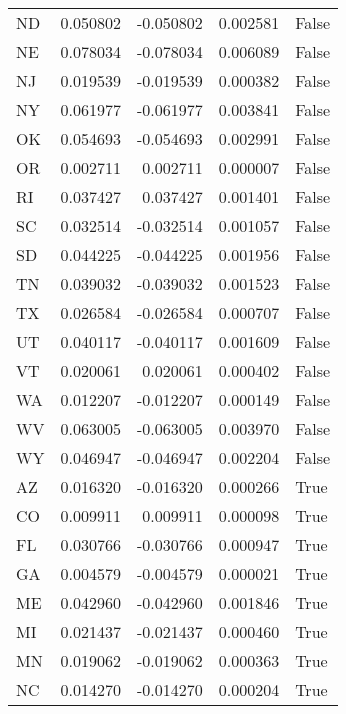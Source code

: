 \begin{table}
\begin{tabular}{lrrrl}
      ND &   0.050802 & -0.050802 &       0.002581 &         False \\
      NE &   0.078034 & -0.078034 &       0.006089 &         False \\
      NJ &   0.019539 & -0.019539 &       0.000382 &         False \\
      NY &   0.061977 & -0.061977 &       0.003841 &         False \\
      OK &   0.054693 & -0.054693 &       0.002991 &         False \\
      OR &   0.002711 &  0.002711 &       0.000007 &         False \\
      RI &   0.037427 &  0.037427 &       0.001401 &         False \\
      SC &   0.032514 & -0.032514 &       0.001057 &         False \\
      SD &   0.044225 & -0.044225 &       0.001956 &         False \\
      TN &   0.039032 & -0.039032 &       0.001523 &         False \\
      TX &   0.026584 & -0.026584 &       0.000707 &         False \\
      UT &   0.040117 & -0.040117 &       0.001609 &         False \\
      VT &   0.020061 &  0.020061 &       0.000402 &         False \\
      WA &   0.012207 & -0.012207 &       0.000149 &         False \\
      WV &   0.063005 & -0.063005 &       0.003970 &         False \\
      WY &   0.046947 & -0.046947 &       0.002204 &         False \\
      AZ &   0.016320 & -0.016320 &       0.000266 &          True \\
      CO &   0.009911 &  0.009911 &       0.000098 &          True \\
      FL &   0.030766 & -0.030766 &       0.000947 &          True \\
      GA &   0.004579 & -0.004579 &       0.000021 &          True \\
      ME &   0.042960 & -0.042960 &       0.001846 &          True \\
      MI &   0.021437 & -0.021437 &       0.000460 &          True \\
      MN &   0.019062 & -0.019062 &       0.000363 &          True \\
      NC &   0.014270 & -0.014270 &       0.000204 &          True \\

\end{tabular}
\end{table}
